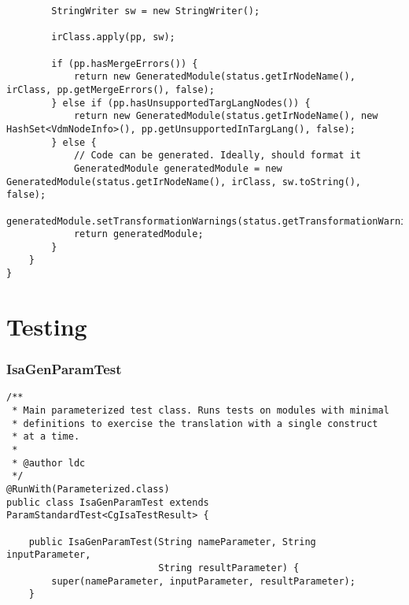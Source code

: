 \begin{appendices}
\begin{lstlisting}
        StringWriter sw = new StringWriter();

        irClass.apply(pp, sw);

        if (pp.hasMergeErrors()) {
            return new GeneratedModule(status.getIrNodeName(), irClass, pp.getMergeErrors(), false);
        } else if (pp.hasUnsupportedTargLangNodes()) {
            return new GeneratedModule(status.getIrNodeName(), new HashSet<VdmNodeInfo>(), pp.getUnsupportedInTargLang(), false);
        } else {
            // Code can be generated. Ideally, should format it
            GeneratedModule generatedModule = new GeneratedModule(status.getIrNodeName(), irClass, sw.toString(), false);
            generatedModule.setTransformationWarnings(status.getTransformationWarnings());
            return generatedModule;
        }
    }
}
\end{lstlisting}



\chapter{Testing} \label{testing}
\subsection{IsaGenParamTest}
\begin{lstlisting}
/**
 * Main parameterized test class. Runs tests on modules with minimal
 * definitions to exercise the translation with a single construct
 * at a time.
 *
 * @author ldc
 */
@RunWith(Parameterized.class)
public class IsaGenParamTest extends ParamStandardTest<CgIsaTestResult> {

    public IsaGenParamTest(String nameParameter, String inputParameter,
                           String resultParameter) {
        super(nameParameter, inputParameter, resultParameter);
    }


\end{lstlisting}
\end{appendices}
